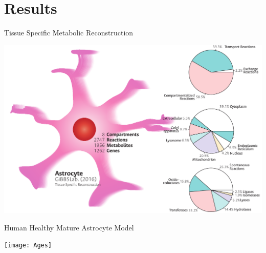 \documentclass[11pt]{beamer}
\begin{document}
\section{Results}
\begin{frame}{Tissue Specific Metabolic Reconstruction}
\begin{center}
\includegraphics[width=\textwidth]{Astrocyte}
\end{center}
\end{frame}
\begin{frame}{Human Healthy Mature Astrocyte Model}
\begin{center}
\texttt{[image: Ages]}
\end{center}
\end{frame}
\end{document}
